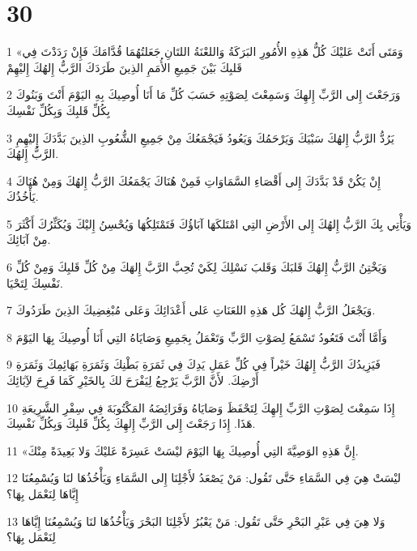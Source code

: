 \chapter{30}

\par 1 «وَمَتَى أَتَتْ عَليْكَ كُلُّ هَذِهِ الأُمُورِ البَرَكَةُ وَاللعْنَةُ اللتَانِ جَعَلتُهُمَا قُدَّامَكَ فَإِنْ رَدَدْتَ فِي قَلبِكَ بَيْنَ جَمِيعِ الأُمَمِ الذِينَ طَرَدَكَ الرَّبُّ إِلهُكَ إِليْهِمْ
\par 2 وَرَجَعْتَ إِلى الرَّبِّ إِلهِكَ وَسَمِعْتَ لِصَوْتِهِ حَسَبَ كُلِّ مَا أَنَا أُوصِيكَ بِهِ اليَوْمَ أَنْتَ وَبَنُوكَ بِكُلِّ قَلبِكَ وَبِكُلِّ نَفْسِكَ
\par 3 يَرُدُّ الرَّبُّ إِلهُكَ سَبْيَكَ وَيَرْحَمُكَ وَيَعُودُ فَيَجْمَعُكَ مِنْ جَمِيعِ الشُّعُوبِ الذِينَ بَدَّدَكَ إِليْهِمِ الرَّبُّ إِلهُكَ.
\par 4 إِنْ يَكُنْ قَدْ بَدَّدَكَ إِلى أَقْصَاءِ السَّمَاوَاتِ فَمِنْ هُنَاكَ يَجْمَعُكَ الرَّبُّ إِلهُكَ وَمِنْ هُنَاكَ يَأْخُذُكَ.
\par 5 وَيَأْتِي بِكَ الرَّبُّ إِلهُكَ إِلى الأَرْضِ التِي امْتَلكَهَا آبَاؤُكَ فَتَمْتَلِكُهَا وَيُحْسِنُ إِليْكَ وَيُكَثِّرُكَ أَكْثَرَ مِنْ آبَائِكَ.
\par 6 وَيَخْتِنُ الرَّبُّ إِلهُكَ قَلبَكَ وَقَلبَ نَسْلِكَ لِكَيْ تُحِبَّ الرَّبَّ إِلهَكَ مِنْ كُلِّ قَلبِكَ وَمِنْ كُلِّ نَفْسِكَ لِتَحْيَا.
\par 7 وَيَجْعَلُ الرَّبُّ إِلهُكَ كُل هَذِهِ اللعَنَاتِ عَلى أَعْدَائِكَ وَعَلى مُبْغِضِيكَ الذِينَ طَرَدُوكَ.
\par 8 وَأَمَّا أَنْتَ فَتَعُودُ تَسْمَعُ لِصَوْتِ الرَّبِّ وَتَعْمَلُ بِجَمِيعِ وَصَايَاهُ التِي أَنَا أُوصِيكَ بِهَا اليَوْمَ
\par 9 فَيَزِيدُكَ الرَّبُّ إِلهُكَ خَيْراً فِي كُلِّ عَمَلِ يَدِكَ فِي ثَمَرَةِ بَطْنِكَ وَثَمَرَةِ بَهَائِمِكَ وَثَمَرَةِ أَرْضِكَ. لأَنَّ الرَّبَّ يَرْجِعُ لِيَفْرَحَ لكَ بِالخَيْرِ كَمَا فَرِحَ لآِبَائِكَ
\par 10 إِذَا سَمِعْتَ لِصَوْتِ الرَّبِّ إِلهِكَ لِتَحْفَظَ وَصَايَاهُ وَفَرَائِضَهُ المَكْتُوبَةَ فِي سِفْرِ الشَّرِيعَةِ هَذَا. إِذَا رَجَعْتَ إِلى الرَّبِّ إِلهِكَ بِكُلِّ قَلبِكَ وَبِكُلِّ نَفْسِكَ.
\par 11 «إِنَّ هَذِهِ الوَصِيَّةَ التِي أُوصِيكَ بِهَا اليَوْمَ ليْسَتْ عَسِرَةً عَليْكَ وَلا بَعِيدَةً مِنْكَ.
\par 12 ليْسَتْ هِيَ فِي السَّمَاءِ حَتَّى تَقُول: مَنْ يَصْعَدُ لأَجْلِنَا إِلى السَّمَاءِ وَيَأْخُذُهَا لنَا وَيُسْمِعُنَا إِيَّاهَا لِنَعْمَل بِهَا؟
\par 13 وَلا هِيَ فِي عَبْرِ البَحْرِ حَتَّى تَقُول: مَنْ يَعْبُرُ لأَجْلِنَا البَحْرَ وَيَأْخُذُهَا لنَا وَيُسْمِعُنَا إِيَّاهَا لِنَعْمَل بِهَا؟
